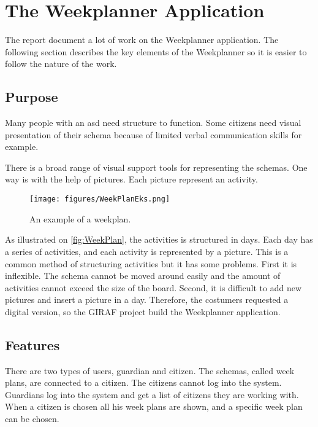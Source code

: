 \section{The Weekplanner Application}\label{sec:TheWeekplannerApplication}

The report document a lot of work on the Weekplanner application. The following section describes the key elements of the Weekplanner so it is easier to follow the nature of the work.

\subsection{Purpose}
Many people with an \gls{asd} need structure to function. Some \glspl{citizen} need visual presentation\cite{VisualSupport} of their schema because of limited verbal communication skills for example. 

There is a broad range of visual support tools for representing the schemas. One way is with the help of pictures. Each picture represent an activity.

\begin{figure}[H]
    \begin{center}
        \texttt{[image: figures/WeekPlanEks.png]}
    \end{center}
    \caption{An example of a weekplan.\cite{VisualSupport}}
    \label{fig:WeekPlan}
\end{figure}

As illustrated on \autoref{fig:WeekPlan}, the activities is structured in days. Each day has a series of activities, and each activity is represented by a picture.
This is a common method of structuring activities but it has some problems. First it is inflexible. The schema cannot be moved around easily and the amount of activities cannot exceed the size of the board. Second, it is difficult to add new pictures and insert a picture in a day. 
Therefore, the costumers requested a digital version, so the GIRAF project build the Weekplanner application.

\subsection{Features}
There are two types of users, \gls{guardian} and \gls{citizen}. The schemas, called week plans, are connected to a \gls{citizen}. The \glspl{citizen} cannot log into the system. Guardians log into the system and get a list of citizens they are working with. When a \gls{citizen} is chosen all his week plans are shown, and a specific week plan can be chosen. 

